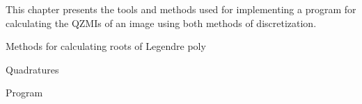 This chapter presents the tools and methods used for implementing a program for calculating the QZMIs of an image using both methods of discretization.  







Methods for calculating roots of Legendre poly

Quadratures

Program